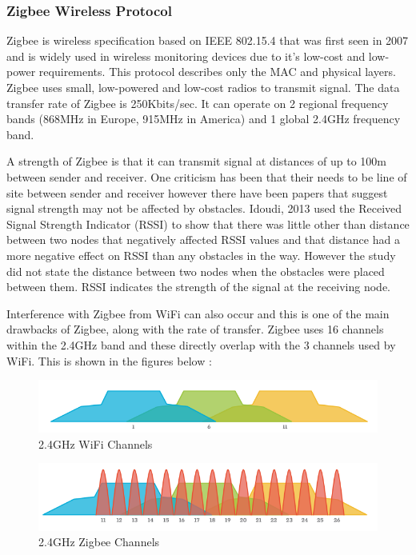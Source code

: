 \documentclass[10pt,a4paper]{article}
\begin{document}
\subsubsection{Zigbee Wireless Protocol}
Zigbee is wireless specification based on IEEE 802.15.4 that was first seen in 2007 and is widely used in wireless monitoring devices due to it's low-cost and low-power requirements. This protocol describes only the MAC and physical layers\cite{Elarabi2015}. Zigbee uses small, low-powered and low-cost radios to transmit signal. The data transfer rate of Zigbee is 250Kbits/sec. It can operate on 2 regional frequency bands (868MHz in Europe, 915MHz in America) and 1 global 2.4GHz frequency band\cite{ZigbeeAlliance}. 

A strength of Zigbee is that it can transmit signal at distances of up to 100m between sender and receiver. One criticism has been that their needs to be line of site between sender and receiver however there have been papers that suggest signal strength may not be affected by obstacles. Idoudi, 2013 used the Received Signal Strength Indicator (RSSI) to show that there was little other than distance between two nodes that negatively affected RSSI values and that distance had a more negative effect on RSSI than any obstacles in the way\cite{Idoudi2013}. However the study did not state the distance between two nodes when the obstacles were placed between them. RSSI indicates the strength of the signal at the receiving node. 

Interference with Zigbee from WiFi can also occur and this is one of the main drawbacks of Zigbee, along with the rate of transfer. Zigbee uses 16 channels within the 2.4GHz band and these directly overlap with the 3 channels used by WiFi. This is shown in the figures below \cite{zigbeechannels}:

\begin{figure}[H]
\centering
  \includegraphics[width=\linewidth]{images/wifi_channels.png}
  \caption{2.4GHz WiFi Channels}
  \label{fig:wifichannels}
\end{figure}

\begin{figure}[H]
\centering
  \includegraphics[width=\linewidth]{images/zigbee_channels.png}
  \caption{2.4GHz Zigbee Channels}
  \label{fig:zigbeechannels}
\end{figure}
\end{document}
